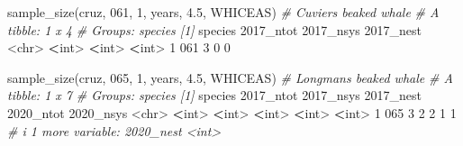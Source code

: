 \documentclass[
]{book}
\newenvironment{Shaded}{\begin{snugshade}}{\end{snugshade}}
\newcommand{\AttributeTok}[1]{\textcolor[rgb]{0.77,0.63,0.00}{#1}}
\newcommand{\CommentTok}[1]{\textcolor[rgb]{0.56,0.35,0.01}{\textit{#1}}}
\newcommand{\DecValTok}[1]{\textcolor[rgb]{0.00,0.00,0.81}{#1}}
\newcommand{\ErrorTok}[1]{\textcolor[rgb]{0.64,0.00,0.00}{\textbf{#1}}}
\newcommand{\FloatTok}[1]{\textcolor[rgb]{0.00,0.00,0.81}{#1}}
\newcommand{\FunctionTok}[1]{\textcolor[rgb]{0.00,0.00,0.00}{#1}}
\newcommand{\NormalTok}[1]{#1}
\newcommand{\SpecialCharTok}[1]{\textcolor[rgb]{0.00,0.00,0.00}{#1}}
\newcommand{\StringTok}[1]{\textcolor[rgb]{0.31,0.60,0.02}{#1}}
\begin{document}
\begin{Shaded}
\begin{Highlighting}[]
\FunctionTok{sample\_size}\NormalTok{(cruz, }\StringTok{\textquotesingle{}061\textquotesingle{}}\NormalTok{, }\DecValTok{1}\NormalTok{, years, }\FloatTok{4.5}\NormalTok{, }\StringTok{\textquotesingle{}WHICEAS\textquotesingle{}}\NormalTok{) }\CommentTok{\# Cuvier\textquotesingle{}s beaked whale}
\CommentTok{\# A tibble: 1 x 4}
\CommentTok{\# Groups:   species [1]}
\NormalTok{  species }\StringTok{\textasciigrave{}}\AttributeTok{2017\_ntot}\StringTok{\textasciigrave{}} \StringTok{\textasciigrave{}}\AttributeTok{2017\_nsys}\StringTok{\textasciigrave{}} \StringTok{\textasciigrave{}}\AttributeTok{2017\_nest}\StringTok{\textasciigrave{}}
  \SpecialCharTok{\textless{}}\NormalTok{chr}\SpecialCharTok{\textgreater{}}         \ErrorTok{\textless{}}\NormalTok{int}\SpecialCharTok{\textgreater{}}       \ErrorTok{\textless{}}\NormalTok{int}\SpecialCharTok{\textgreater{}}       \ErrorTok{\textless{}}\NormalTok{int}\SpecialCharTok{\textgreater{}}
\DecValTok{1} \DecValTok{061}               \DecValTok{3}           \DecValTok{0}           \DecValTok{0}

\FunctionTok{sample\_size}\NormalTok{(cruz, }\StringTok{\textquotesingle{}065\textquotesingle{}}\NormalTok{, }\DecValTok{1}\NormalTok{, years, }\FloatTok{4.5}\NormalTok{, }\StringTok{\textquotesingle{}WHICEAS\textquotesingle{}}\NormalTok{) }\CommentTok{\# Longman\textquotesingle{}s beaked whale}
\CommentTok{\# A tibble: 1 x 7}
\CommentTok{\# Groups:   species [1]}
\NormalTok{  species }\StringTok{\textasciigrave{}}\AttributeTok{2017\_ntot}\StringTok{\textasciigrave{}} \StringTok{\textasciigrave{}}\AttributeTok{2017\_nsys}\StringTok{\textasciigrave{}} \StringTok{\textasciigrave{}}\AttributeTok{2017\_nest}\StringTok{\textasciigrave{}} \StringTok{\textasciigrave{}}\AttributeTok{2020\_ntot}\StringTok{\textasciigrave{}} \StringTok{\textasciigrave{}}\AttributeTok{2020\_nsys}\StringTok{\textasciigrave{}}
  \SpecialCharTok{\textless{}}\NormalTok{chr}\SpecialCharTok{\textgreater{}}         \ErrorTok{\textless{}}\NormalTok{int}\SpecialCharTok{\textgreater{}}       \ErrorTok{\textless{}}\NormalTok{int}\SpecialCharTok{\textgreater{}}       \ErrorTok{\textless{}}\NormalTok{int}\SpecialCharTok{\textgreater{}}       \ErrorTok{\textless{}}\NormalTok{int}\SpecialCharTok{\textgreater{}}       \ErrorTok{\textless{}}\NormalTok{int}\SpecialCharTok{\textgreater{}}
\DecValTok{1} \DecValTok{065}               \DecValTok{3}           \DecValTok{2}           \DecValTok{2}           \DecValTok{1}           \DecValTok{1}
\CommentTok{\# i 1 more variable: \textasciigrave{}2020\_nest\textasciigrave{} \textless{}int\textgreater{}}


\end{Highlighting}
\end{Shaded}
\end{document}
